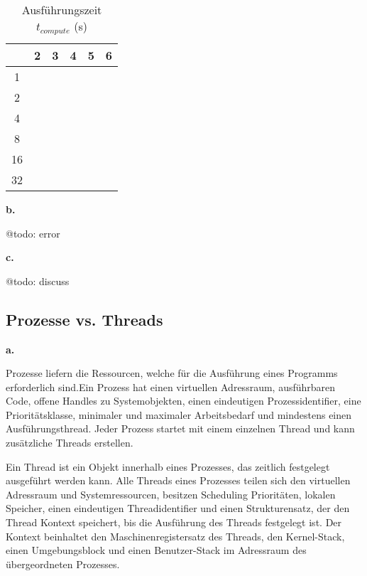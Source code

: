 \documentclass[12pt]{article}
\begin{document}
\begin{table}[ht]
	\centering
	\caption[Ausführungszeit $t_{wall}$ (\si{\second})]{Ausführungszeit $t_{compute}$ (\si{\second})}
	\begin{tabular}{c|l|l|l|l|l}
		\hline
		\cellcolor{gray!40}\textbf{\diagbox{Threads}{n}} & \multicolumn{1}{c}{\cellcolor{gray!40}\textbf{2}} & \multicolumn{1}{c}{\cellcolor{gray!40}\textbf{3}} & \multicolumn{1}{c}{\cellcolor{gray!40}\textbf{4}} &
		\multicolumn{1}{c}{\cellcolor{gray!40}\textbf{5}} &
		\multicolumn{1}{c}{\cellcolor{gray!40}\textbf{6}} \\
		\hline\hline
		1 &  &  & & & \\\hline
		2 &  &  & & & \\\hline
		4 &  &  & & & \\\hline
		8 &  &  & & & \\\hline
		16 &  &  & & & \\\hline
		32 &  &  & & & \\\hline
	\end{tabular}
	\label{tab:twall}
\end{table}

\noindent \textbf{b.}

@todo: error

\noindent \textbf{c.}

@todo: discuss

\subsection{Prozesse vs. Threads}

\noindent \textbf{a.}

Prozesse liefern die Ressourcen, welche für die Ausführung eines Programms erforderlich sind.Ein Prozess hat einen virtuellen Adressraum, ausführbaren Code, offene Handles zu Systemobjekten, einen eindeutigen Prozessidentifier, eine Prioritätsklasse, minimaler und maximaler Arbeitsbedarf und mindestens einen Ausführungsthread. Jeder Prozess startet mit einem einzelnen Thread und kann zusätzliche Threads erstellen.

Ein Thread ist ein Objekt innerhalb eines Prozesses, das zeitlich festgelegt ausgeführt werden kann. Alle Threads eines Prozesses teilen sich den virtuellen Adressraum und Systemressourcen, besitzen Scheduling Prioritäten, lokalen Speicher, einen eindeutigen Threadidentifier und einen Strukturensatz, der den Thread Kontext speichert, bis die Ausführung des Threads festgelegt ist. Der Kontext beinhaltet den Maschinenregistersatz des Threads, den Kernel-Stack, einen Umgebungsblock und einen Benutzer-Stack im Adressraum des übergeordneten Prozesses.
\end{document}
